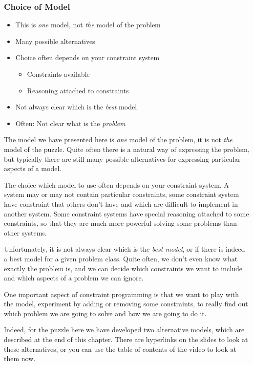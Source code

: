 \begin{frame}
\frametitle{Choice of Model}
\label{sendmore:Choice of model}
\begin{itemize}
\item This is {\em one} model, not {\em the} model of the problem
\item Many possible alternatives
\item Choice often depends on your constraint system
\begin{itemize}
\item Constraints available
\item Reasoning attached to constraints
\end{itemize}
\item Not always clear which is the {\em best} model
\item Often: Not clear what is the {\em problem}
\end{itemize}
\end{frame}

The model we have presented here is {\em one} model of the problem, it is not {\em the} model of the puzzle. Quite often there is a natural way of expressing the problem, but typically there are still many possible alternatives for expressing particular aspects of a model.

The choice which model to use often depends on your constraint system. A system may or may not contain particular constraints, some constraint system have constraint that others don't have and which are difficult to implement in another system. Some constraint systems have special reasoning attached to some constraints, so that they are much more powerful solving some problems than other systems.

Unfortunately, it is not always clear which is the {\em best model}, or if there is indeed a best model for a given problem class. Quite often, we don't even know what exactly the problem is, and we can decide which constraints we want to include and which aspects of a problem we can ignore.

One important aspect of constraint programming is that we want to play with the model, experiment by adding or removing some constraints, to really find out which problem we are going to solve and how we are going to do it.

Indeed, for the puzzle here we have developed two alternative models, which are described at the end of this chapter. There are hyperlinks on the slides to look at these alternatives, or you can use the table of contents of the video to look at them now.


